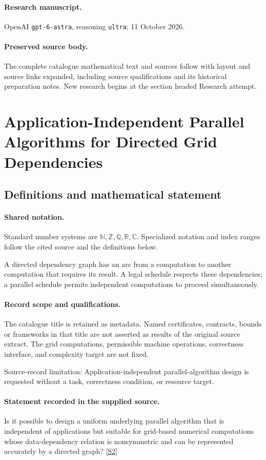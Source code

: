 \documentclass[11pt]{article}
\begin{document}
\paragraph{Research manuscript.} OpenAI \texttt{gpt-6-astra}, reasoning \texttt{ultra}; 11 October 2026.
\paragraph{Preserved source body.} The complete catalogue mathematical text and sources follow with layout and source links expanded, including source qualifications and its historical preparation notes. New research begins at the section headed Research attempt.

\section{Application-Independent Parallel Algorithms for Directed Grid Dependencies}\label{statement}

\subsection{Definitions and mathematical statement}

\paragraph{Shared notation.}Standard number systems are $\mathbb N,\mathbb Z,\mathbb Q,\mathbb R,\mathbb C$. Specialized notation and index ranges follow the cited source and the definitions below.


A directed dependency graph has an arc from a computation to another computation that requires its result. A legal schedule respects these dependencies; a parallel schedule permits independent computations to proceed simultaneously.
\paragraph{Record scope and qualifications.}
The catalogue title is retained as metadata. Named certificates, contracts, bounds or frameworks in that title are not asserted as results of the original source extract.
The grid computations, permissible machine operations, correctness interface, and complexity target are not fixed.

Source-record limitation: Application-independent parallel-algorithm design is requested without a task, correctness condition, or resource target.
\paragraph{Statement recorded in the supplied source.}
Is it possible to design a uniform underlying parallel algorithm that is independent of applications but suitable for grid-based numerical computations whose data-dependency relation is nonsymmetric and can be represented accurately by a directed graph? \href{https://doi.org/10.4171/owr/2005/24}{[S2]}
\end{document}
